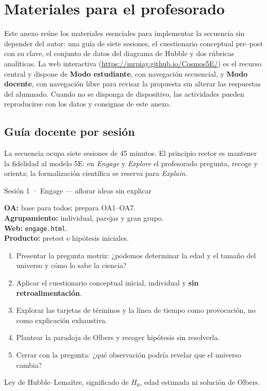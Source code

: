 \chapter{Materiales para el profesorado}\label{cap:anexo-docente}

Este anexo reúne los materiales esenciales para implementar la secuencia sin depender del autor: una guía de siete sesiones, el cuestionario conceptual pre--post con su clave, el conjunto de datos del diagrama de Hubble y dos rúbricas analíticas. La web interactiva (\url{https://mrpiay.github.io/Cosmos5E/}) es el recurso central y dispone de \textbf{Modo estudiante}, con navegación secuencial, y \textbf{Modo docente}, con navegación libre para revisar la propuesta sin alterar las respuestas del alumnado. Cuando no se disponga de dispositivo, las actividades pueden reproducirse con los datos y consignas de este anexo.

\section*{Guía docente por sesión}

La secuencia ocupa siete sesiones de 45 minutos. El principio rector es mantener la fidelidad al modelo 5E: en \textit{Engage} y \textit{Explore} el profesorado pregunta, recoge y orienta; la formalización científica se reserva para \textit{Explain}.

\begin{guiaficha}{Sesión 1 · Engage --- aflorar ideas sin explicar}
\begin{guiameta}
\textbf{OA:} base para todos; prepara OA1--OA7.\\
\textbf{Agrupamiento:} individual, parejas y gran grupo.\\
\textbf{Web:} \texttt{engage.html}.\\
\textbf{Producto:} pretest e hipótesis iniciales.
\end{guiameta}
\begin{enumerate}[leftmargin=*,itemsep=2pt]
\item {} Presentar la pregunta motriz: ¿podemos determinar la edad y el tamaño del universo y cómo lo sabe la ciencia?
\item {} Aplicar el cuestionario conceptual inicial, individual y \textbf{sin retroalimentación}.
\item {} Explorar las tarjetas de términos y la línea de tiempo como provocación, no como explicación exhaustiva.
\item {} Plantear la paradoja de Olbers y recoger hipótesis sin resolverla.
\item {} Cerrar con la pregunta: ¿qué observación podría revelar que el universo cambia?
\end{enumerate}
 Ley de Hubble--Lemaître, significado de $H_0$, edad estimada ni solución de Olbers.
\end{guiaficha}

